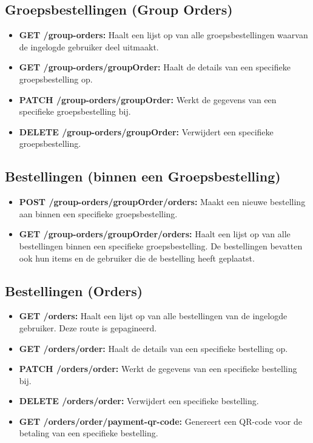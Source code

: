 \subsection{Groepsbestellingen (Group Orders)}

\begin{itemize}
  \item \textbf{GET /group-orders:} Haalt een lijst op van alle groepsbestellingen waarvan de ingelogde gebruiker deel uitmaakt.
  \item \textbf{GET /group-orders/{groupOrder}:} Haalt de details van een specifieke groepsbestelling op.
  \item \textbf{PATCH /group-orders/{groupOrder}:} Werkt de gegevens van een specifieke groepsbestelling bij.
  \item \textbf{DELETE /group-orders/{groupOrder}:} Verwijdert een specifieke groepsbestelling.
\end{itemize}

\subsection{Bestellingen (binnen een Groepsbestelling)}

\begin{itemize}
  \item \textbf{POST /group-orders/{groupOrder}/orders:} Maakt een nieuwe bestelling aan binnen een specifieke groepsbestelling.
  \item \textbf{GET /group-orders/{groupOrder}/orders:} Haalt een lijst op van alle bestellingen binnen een specifieke groepsbestelling. De bestellingen bevatten ook hun items en de gebruiker die de bestelling heeft geplaatst.
\end{itemize}

\subsection{Bestellingen (Orders)}

\begin{itemize}
  \item \textbf{GET /orders:} Haalt een lijst op van alle bestellingen van de ingelogde gebruiker. Deze route is gepagineerd.
  \item \textbf{GET /orders/{order}:} Haalt de details van een specifieke bestelling op.
  \item \textbf{PATCH /orders/{order}:} Werkt de gegevens van een specifieke bestelling bij.
  \item \textbf{DELETE /orders/{order}:} Verwijdert een specifieke bestelling.
  \item \textbf{GET /orders/{order}/payment-qr-code:} Genereert een QR-code voor de betaling van een specifieke bestelling.
\end{itemize}

